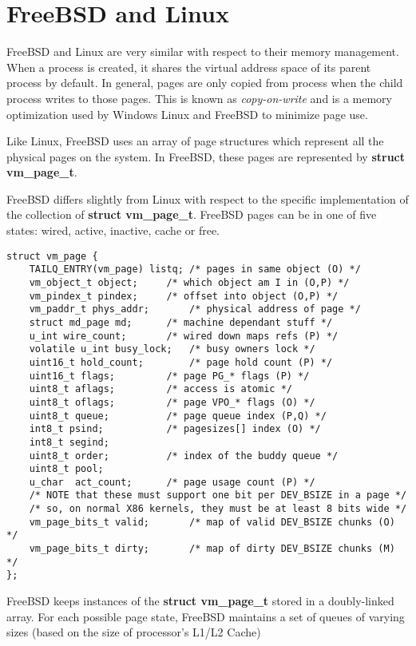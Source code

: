 \documentclass[onecolumn,10pt]{IEEETran}
\begin{document}
\section{FreeBSD and Linux}

	FreeBSD and Linux are very similar with respect to their memory management.  When a process is created, it shares the virtual address space of its parent process by default.  In general, pages are only copied from process when the child process writes to those pages.  This is known as \textit{copy-on-write} and is a memory optimization used by Windows Linux and FreeBSD to minimize page use.

Like Linux, FreeBSD uses an array of page structures which represent all the physical pages on the system.  In FreeBSD, these pages are represented by \textbf{struct vm\_page\_t}.  

FreeBSD differs slightly from Linux with respect to the specific implementation of the collection of \textbf{struct vm\_page\_t}.  FreeBSD pages can be in one of five states: wired, active, inactive, cache or free.

\begin{lstlisting}
struct vm_page {
	TAILQ_ENTRY(vm_page) listq;	/* pages in same object (O) */
	vm_object_t object;		/* which object am I in (O,P) */
	vm_pindex_t pindex;		/* offset into object (O,P) */
	vm_paddr_t phys_addr;		/* physical address of page */
	struct md_page md;		/* machine dependant stuff */
	u_int wire_count;		/* wired down maps refs (P) */
	volatile u_int busy_lock;	/* busy owners lock */
	uint16_t hold_count;		/* page hold count (P) */
	uint16_t flags;			/* page PG_* flags (P) */
	uint8_t aflags;			/* access is atomic */
	uint8_t oflags;			/* page VPO_* flags (O) */
	uint8_t	queue;			/* page queue index (P,Q) */
	int8_t psind;			/* pagesizes[] index (O) */
	int8_t segind;
	uint8_t	order;			/* index of the buddy queue */
	uint8_t pool;
	u_char	act_count;		/* page usage count (P) */
	/* NOTE that these must support one bit per DEV_BSIZE in a page */
	/* so, on normal X86 kernels, they must be at least 8 bits wide */
	vm_page_bits_t valid;		/* map of valid DEV_BSIZE chunks (O) */
	vm_page_bits_t dirty;		/* map of dirty DEV_BSIZE chunks (M) */
};
\end{lstlisting}

FreeBSD keeps instances of the \textbf{struct vm\_page\_t} stored in a doubly-linked array.  For each possible page state, FreeBSD maintains a set of queues of varying sizes (based on the size of processor's L1/L2 Cache)
\end{document}
